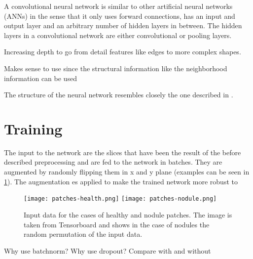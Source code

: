 \documentclass[main.tex]{subfiles}
\begin{document}
A convolutional neural network is similar to other artificial neural networks (ANNs) in the sense that it only uses forward connections, has an input and output layer and an arbitrary number of hidden layers in between. The hidden layers in a convolutional network are either convolutional or pooling layers. 

Increasing depth to go from detail features like edges to more complex shapes.

Makes sense to use since the structural information like the neighborhood information can be used


The structure of the neural network resembles closely the one described in \cite{huang2017lung}. 



\section{Training}
The input to the network are the slices that have been the result of the before described preprocessing and are fed to the network in batches. They are augmented by randomly flipping them in x and y plane (examples can be seen in \ref{fig:input}). The augmentation es applied to make the trained network more robust to 

\begin{figure}
\begin{center}
\texttt{[image: patches-health.png]}
\texttt{[image: patches-nodule.png]}
\end{center}
\caption{Input data for the cases of healthy and nodule patches. The image is taken from Tensorboard and shows in the case of nodules the random permutation of the input data.}
\label{fig:input}
\end{figure}

Why use batchnorm?
Why use dropout?
Compare with and without
\end{document}
